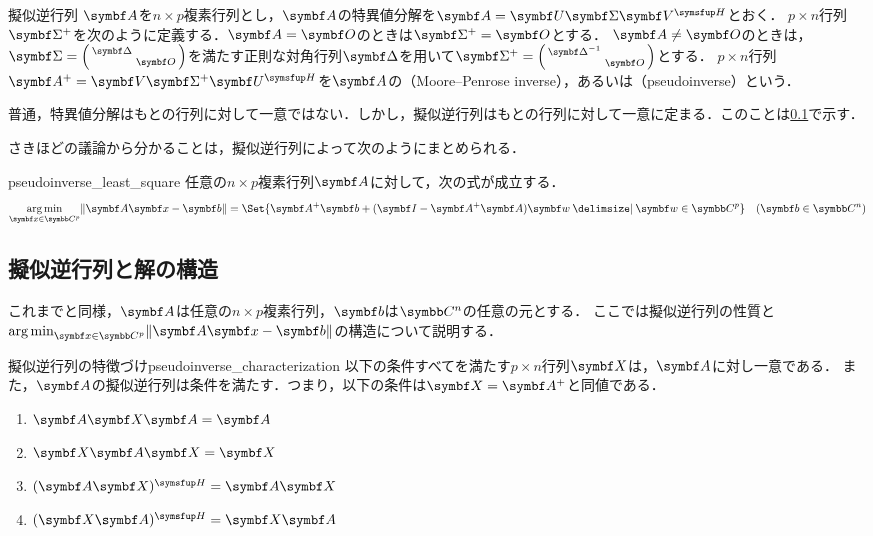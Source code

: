 \documentclass[../../main]{subfiles}
\begin{document}
\begin{definition}{擬似逆行列}{}
  \(\mat{A}\)を\(n\times p\)複素行列とし，\(\mat{A}\)の特異値分解を\(\mat{A}=\mat{U}\mat{\Sigma}\htrps{\mat{V}}\)とおく．
  \(p\times n\)行列\(\pinv{\mat{\Sigma}}\)を次のように定義する．\(\mat{A}=\zmat\)のときは\(\pinv{\mat{\Sigma}}=\zmat\)とする．
  \(\mat{A}\neq\zmat\)のときは，\(\mat{\Sigma}=\smallmatrice{\mat{\Delta} & \\ & \zmat}\)を満たす正則な対角行列\(\mat{\Delta}\)を用いて\(\pinv{\mat{\Sigma}}=\smallmatrice{\mat{\Delta}^{-1} & \\ & \zmat}\)とする．
  \(p\times n\)行列\(\pinv{\mat{A}}=\mat{V}\pinv{\mat{\Sigma}}\htrps{\mat{U}}\)を\(\mat{A}\)の（Moore–Penrose inverse），あるいは（pseudoinverse）という．
\end{definition}

\begin{note}
  普通，特異値分解はもとの行列に対して一意ではない．しかし，擬似逆行列はもとの行列に対して一意に定まる．このことは\cref{subsection:pseudoinverse}で示す．
\end{note}

さきほどの議論から分かることは，擬似逆行列によって次のようにまとめられる．

\begin{proposition}{}{pseudoinverse_least_square}
  任意の\(n\times p\)複素行列\(\mat{A}\)に対して，次の式が成立する．
  \[
    \argmin_{\vect{x}\in\numset{C}^p}\vnorm{\mat{A}\vect{x}-\vect{b}} = \Set{\pinv{\mat{A}}\vect{b}+(\imat-\pinv{\mat{A}}\mat{A})\vect{w}\given\vect{w}\in\numset{C}^p}\quad(\vect{b}\in\numset{C}^n)
  \]
\end{proposition}

\subsection{擬似逆行列と解の構造}
\label{subsection:pseudoinverse}

これまでと同様，\(\mat{A}\)は任意の\(n\times p\)複素行列，\(\vect{b}\)は\(\numset{C}^n\)の任意の元とする．
ここでは擬似逆行列の性質と\(\argmin_{\vect{x}\in\numset{C}^p}\vnorm{\mat{A}\vect{x}-\vect{b}}\)の構造について説明する．

\begin{proposition}{擬似逆行列の特徴づけ}{pseudoinverse_characterization}
  以下の条件すべてを満たす\(p\times n\)行列\(\mat{X}\)は，\(\mat{A}\)に対し一意である．
  また，\(\mat{A}\)の擬似逆行列は条件を満たす．つまり，以下の条件は\(\mat{X}=\pinv{\mat{A}}\)と同値である．
  \begin{enumerate}
    \item \(\mat{A}\mat{X}\mat{A}=\mat{A}\)
    \item \(\mat{X}\mat{A}\mat{X}=\mat{X}\)
    \item \(\htrps{(\mat{A}\mat{X})}=\mat{A}\mat{X}\)
    \item \(\htrps{(\mat{X}\mat{A})}=\mat{X}\mat{A}\)
  \end{enumerate}
\end{proposition}
\end{document}
